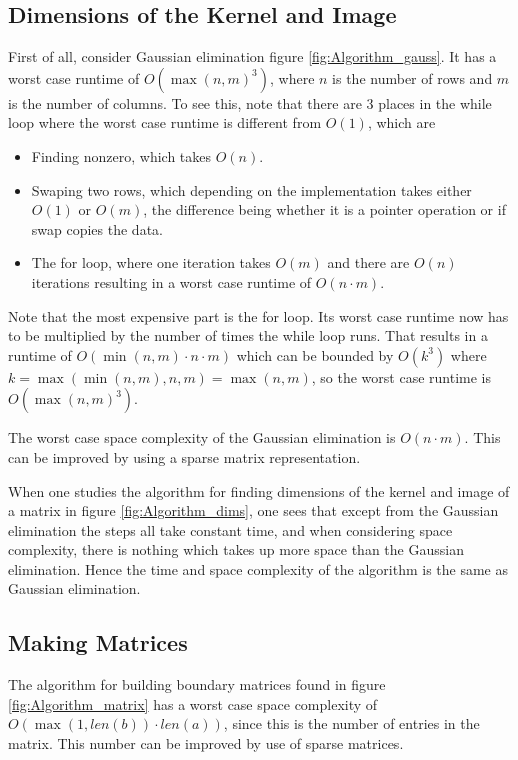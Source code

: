 \documentclass[11pt,a4paper,twoside]{report}
\begin{document}
\subsection{Dimensions of the Kernel and Image}
First of all, consider Gaussian elimination figure \ref{fig:Algorithm_gauss}. It has a worst case runtime of $O(\max(n,m)^3)$, where $n$ is the number of rows and $m$ is the number of columns. To see this, note that there are 3 places in the while loop where the worst case runtime is different from $O(1)$, which are 
\begin{itemize}
\item Finding nonzero, which takes $O(n)$.
\item Swaping two rows, which depending on the implementation takes either $O(1)$ or $O(m)$, the difference being whether it is a pointer operation or if swap copies the data.
\item The for loop, where one iteration takes $O(m)$ and there are $O(n)$ iterations resulting in a worst case runtime of $O(n\cdot m)$.
\end{itemize}
Note that the most expensive part is the for loop. Its worst case runtime now has to be multiplied by the number of times the while loop runs. That results in a runtime of $O(\min(n,m)\cdot n \cdot m)$ which can be bounded by $O(k^3)$ where $k = \max(\min(n,m), n, m)=\max(n,m)$, so the worst case runtime is $O(\max(n,m)^3)$.

The worst case space complexity of the Gaussian elimination is $O(n\cdot m)$. This can be improved by using a sparse matrix representation.

When one studies the algorithm for finding dimensions of the kernel and image of a matrix in figure \ref{fig:Algorithm_dims}, one sees that except from the Gaussian elimination the steps all take constant time, and when considering space complexity, there is nothing which takes up more space than the Gaussian elimination. Hence the time and space complexity of the algorithm is the same as Gaussian elimination.

\subsection{Making Matrices}
The algorithm for building boundary matrices found in figure \ref{fig:Algorithm_matrix} has a worst case space complexity of $O(\max(1,len(b))\cdot len(a))$, since this is the number of entries in the matrix. This number can be improved by use of sparse matrices.
\end{document}
